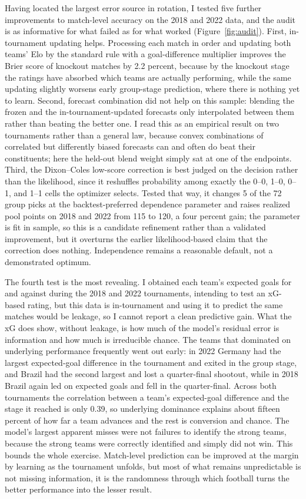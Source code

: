 \documentclass[11pt,a4paper]{article}
\begin{document}
Having located the largest error source in rotation, I tested five further improvements to match-level accuracy on the 2018 and 2022 data, and the audit is as informative for what failed as for what worked (Figure~\ref{fig:audit}). First, in-tournament updating helps. Processing each match in order and updating both teams' Elo by the standard rule with a goal-difference multiplier improves the Brier score of knockout matches by 2.2 percent, because by the knockout stage the ratings have absorbed which teams are actually performing, while the same updating slightly worsens early group-stage prediction, where there is nothing yet to learn. Second, forecast combination did not help on this sample: blending the frozen and the in-tournament-updated forecasts only interpolated between them rather than beating the better one. I read this as an empirical result on two tournaments rather than a general law, because convex combinations of correlated but differently biased forecasts can and often do beat their constituents; here the held-out blend weight simply sat at one of the endpoints. Third, the Dixon--Coles low-score correction \citep{dixoncoles1997} is best judged on the decision rather than the likelihood, since it reshuffles probability among exactly the 0--0, 1--0, 0--1, and 1--1 cells the optimizer selects. Tested that way, it changes 5 of the 72 group picks at the backtest-preferred dependence parameter and raises realized pool points on 2018 and 2022 from 115 to 120, a four percent gain; the parameter is fit in sample, so this is a candidate refinement rather than a validated improvement, but it overturns the earlier likelihood-based claim that the correction does nothing. Independence remains a reasonable default, not a demonstrated optimum.

The fourth test is the most revealing. I obtained each team's expected goals for and against during the 2018 and 2022 tournaments, intending to test an xG-based rating, but this data is in-tournament and using it to predict the same matches would be leakage, so I cannot report a clean predictive gain. What the xG does show, without leakage, is how much of the model's residual error is information and how much is irreducible chance. The teams that dominated on underlying performance frequently went out early: in 2022 Germany had the largest expected-goal difference in the tournament and exited in the group stage, and Brazil had the second largest and lost a quarter-final shootout, while in 2018 Brazil again led on expected goals and fell in the quarter-final. Across both tournaments the correlation between a team's expected-goal difference and the stage it reached is only 0.39, so underlying dominance explains about fifteen percent of how far a team advances and the rest is conversion and chance. The model's largest apparent misses were not failures to identify the strong teams, because the strong teams were correctly identified and simply did not win. This bounds the whole exercise. Match-level prediction can be improved at the margin by learning as the tournament unfolds, but most of what remains unpredictable is not missing information, it is the randomness through which football turns the better performance into the lesser result.
\end{document}
